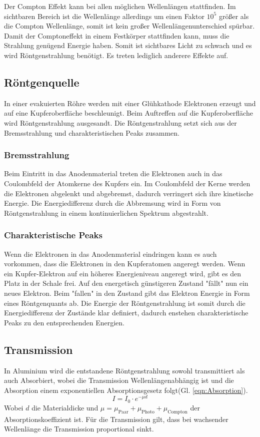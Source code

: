 Der Compton Effekt kann bei allen möglichen Wellenlängen stattfinden.
Im sichtbaren Bereich ist die Wellenlänge allerdings um einen Faktor $10^5$ größer als die Compton Wellenlänge, somit ist kein großer Wellenlängenunterschied spürbar.
Damit der Comptoneffekt in einem Festkörper stattfinden kann, muss die Strahlung genügend Energie haben. Somit ist sichtbares Licht zu schwach und es wird Röntgenstrahlung benötigt.
Es treten lediglich anderere Effekte auf.


\subsection{Röntgenquelle}
In einer evakuierten Röhre werden mit einer Glühkathode Elektronen erzeugt und auf eine Kupferoberfläche beschleunigt.
Beim Auftreffen auf die Kupferoberfläche wird Röntgenstrahlung ausgesandt. Die Röntgenstrahlung setzt sich aus der Bremsstrahlung und charakteristischen Peaks zusammen.

\subsubsection{Bremsstrahlung}
Beim Eintritt in das Anodenmaterial treten die Elektronen auch in das Coulombfeld der Atomkerne des Kupfers ein.
Im Coulombfeld der Kerne werden die Elektronen abgelenkt und abgebremst, dadurch verringert sich ihre kinetische Energie.
Die Energiedifferenz durch die Abbremsung wird in Form von Röntgenstrahlung in einem kontinuierlichen Spektrum abgestrahlt.

\subsubsection{Charakteristische Peaks}
Wenn die Elektronen in das Anodenmaterial eindringen kann es auch vorkommen, dass die Elektronen in den Kupferatomen angeregt werden.
Wenn ein Kupfer-Elektron auf ein höheres Energieniveau angeregt wird, gibt es den Platz in der Schale frei. Auf den energetisch günstigeren Zustand "fällt" nun ein neues Elektron.
Beim "fallen" in den Zustand gibt das Elektron Energie in Form eines Röntgenquants ab.
Die Energie der Röntgenstrahlung ist somit durch die Energiedifferenz der Zustände klar definiert, dadurch enstehen charakteristische Peaks zu den entsprechenden Energien.

\subsection{Transmission}
In Aluminium wird die entstandene Röntgenstrahlung sowohl transmittiert als auch Absorbiert, wobei die Transmission Wellenlängenabhängig ist und die Absorption einem exponentiellen Absorptionsgesetz folgt(Gl. \ref{eqn:Absorption}).
\begin{equation}
    I = I_0 \cdot e^{-\mu d} \label{eqn:Absorption}
\end{equation}
Wobei $d$ die Materialdicke und $\mu = \mu_{\text{Paar}}+\mu_{\text{Photo}}+\mu_{\text{Compton}}$ der Absorptionskoeffizient ist.
Für die Transmission gilt, dass bei wachsender Wellenlänge die Transmission proportional sinkt.

